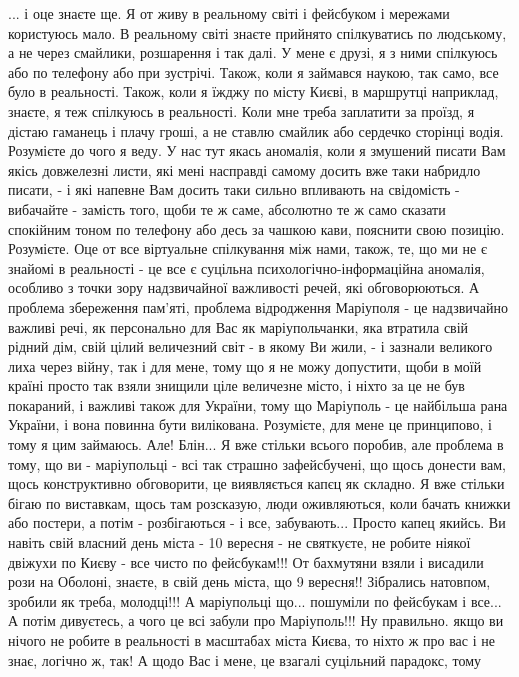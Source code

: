 ... і оце знаєте ще. Я от живу в реальному світі і фейсбуком і мережами
користуюсь мало. В реальному світі знаєте прийнято спілкуватись по людському, а
не через смайлики, розшарення і так далі. У мене є друзі, я з ними спілкуюсь
або по телефону або при зустрічі. Також, коли я займався наукою, так само, все
було в реальності. Також, коли я їжджу по місту Києві, в маршрутці наприклад,
знаєте, я теж спілкуюсь в реальності. Коли мне треба заплатити за проїзд, я
дістаю гаманець і плачу гроші, а не ставлю смайлик або сердечко сторінці водія.
Розумієте до чого я веду. У нас тут якась аномалія, коли я змушений писати Вам
якісь довжелезні листи, які мені насправді самому досить вже таки набридло
писати, - і  які напевне Вам досить таки сильно впливають на свідомість -
вибачайте - замість того, щоби те ж саме, абсолютно те ж само сказати спокійним
тоном по телефону або десь за чашкою кави, пояснити свою позицію. Розумієте.
Оце от все віртуальне спілкування між нами, також, те, що ми не є знайомі в
реальності - це все є суцільна психологічно-інформаційна аномалія, особливо з
точки зору надзвичайної важливості речей, які обговорюються. А проблема
збереження пам'яті, проблема відродження Маріуполя - це надзвичайно важливі
речі, як персонально для Вас як маріупольчанки, яка втратила свій рідний дім,
свій цілий величезний світ - в якому Ви жили, -  і зазнали великого лиха через
війну, так і для мене, тому що я не можу допустити, щоби в моїй країні просто
так взяли знищили ціле величезне місто, і ніхто за це не був покараний, і
важливі також для України, тому що Маріуполь - це найбільша рана України, і
вона повинна бути вилікована. Розумієте, для мене це принципово, і тому я цим
займаюсь. Але! Блін... Я вже стільки всього поробив, але проблема в тому, що ви
- маріупольці - всі так страшно зафейсбучені, що щось донести вам, щось
конструктивно обговорити, це виявляється капєц як складно. Я вже стільки бігаю
по виставкам, щось там розсказую, люди оживляються, коли бачать книжки або
постери, а потім - розбігаються - і все, забувають... Просто капец якийсь. Ви
навіть свій власний день міста - 10 вересня - не святкуєте, не робите ніякої
двіжухи по Києву - все чисто по фейсбукам!!! От бахмутяни взяли і висадили рози
на Оболоні, знаєте, в свій день міста, що 9 вересня!! Зібрались натовпом,
зробили як треба, молодці!!! А маріупольці що... пошуміли по фейсбукам і все...
А потім дивуєтесь, а чого це всі забули про Маріуполь!!! Ну правильно. якщо ви
нічого не робите в реальності в масштабах міста Києва, то ніхто ж про вас і не
знає, логічно ж, так! А щодо Вас і мене, це взагалі суцільний парадокс, тому
